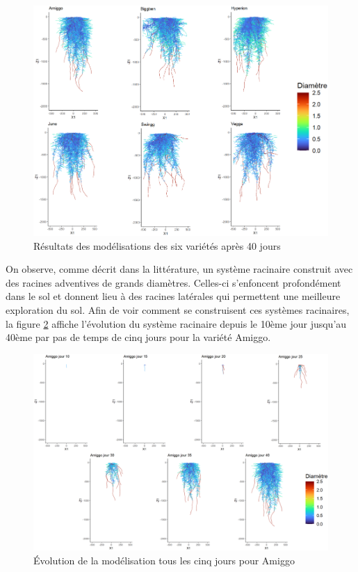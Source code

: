 \begin{figure}[ht]
\centering
\includegraphics[width=1\textwidth]{Image/roots.png}
\caption{Résultats des modélisations des six variétés après 40 jours}
\label{fig:roots}
\end{figure}

On observe, comme décrit dans la littérature, un système racinaire construit avec des racines adventives de grands diamètres.
Celles-ci s'enfoncent profondément dans le sol et donnent lieu à des racines latérales qui permettent une meilleure exploration du sol.
Afin de voir comment se construisent ces systèmes racinaires, la figure \ref{fig:roots_day} affiche l'évolution du système racinaire depuis le 10ème jour jusqu'au 40ème par pas de temps de cinq jours pour la variété Amiggo.
\newpage

\begin{figure}[ht]
\centering
\includegraphics[width=1\textwidth]{Image/root_day.png}
\caption{Évolution de la modélisation tous les cinq jours pour Amiggo}
\label{fig:roots_day}
\end{figure}

